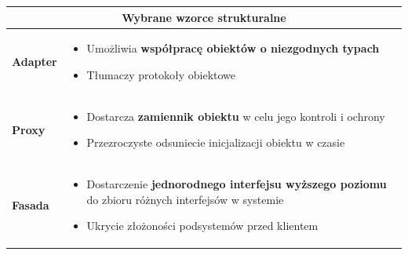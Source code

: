 \documentclass[a4paper]{article}
\begin{document}
    \begin{table}[H]
        \begin{center}
            \begin{tabular}{  p{3cm} p{12cm}  }
                \toprule

                \multicolumn{2}{c}{Wybrane wzorce strukturalne}\\

                \toprule

                \textbf{Adapter}
                &
                \begin{itemize}
                    \item Umożliwia \textbf{współpracę obiektów o niezgodnych typach}
                    \item Tłumaczy protokoły obiektowe
                \end{itemize}
                \\

                \cmidrule(r){1-1}\cmidrule(l){2-2}

                \textbf{Proxy}
                &
                \begin{itemize}
                    \item Dostarcza \textbf{zamiennik obiektu} w celu jego kontroli i ochrony
                    \item Przezroczyste odsuniecie inicjalizacji obiektu w czasie
                \end{itemize}
                \\

                \cmidrule(r){1-1}\cmidrule(l){2-2}
                \textbf{Fasada}
                &
                \begin{itemize}
                    \item Dostarczenie \textbf{jednorodnego interfejsu wyższego poziomu} do zbioru różnych interfejsów w systemie
                    \item Ukrycie złożoności podsystemów przed klientem
                \end{itemize}
                \\
                \bottomrule

            \end{tabular}
        \end{center}
    \end{table}
\end{document}
